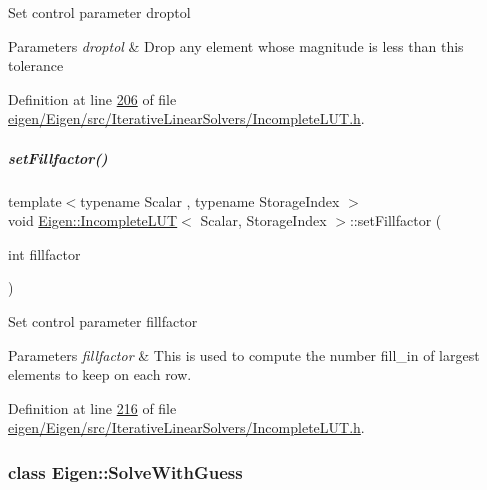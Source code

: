 Set control parameter droptol 
\begin{DoxyParams}{Parameters}
{\em droptol} & Drop any element whose magnitude is less than this tolerance \\
\hline
\end{DoxyParams}


Definition at line \hyperlink{eigen_2_eigen_2src_2_iterative_linear_solvers_2_incomplete_l_u_t_8h_source_l00206}{206} of file \hyperlink{eigen_2_eigen_2src_2_iterative_linear_solvers_2_incomplete_l_u_t_8h_source}{eigen/\+Eigen/src/\+Iterative\+Linear\+Solvers/\+Incomplete\+L\+U\+T.\+h}.

\mbox{\label{group___iterative_linear_solvers___module_a327767d12b55ff8a023f12a030051e17}} 
\subparagraph{\texorpdfstring{set\+Fillfactor()}{setFillfactor()}}
{\footnotesize\ttfamily template$<$typename Scalar , typename Storage\+Index $>$ \\
void \hyperlink{group___iterative_linear_solvers___module_class_eigen_1_1_incomplete_l_u_t}{Eigen\+::\+Incomplete\+L\+UT}$<$ Scalar, Storage\+Index $>$\+::set\+Fillfactor (\begin{DoxyParamCaption}\item[{int}]{fillfactor }\end{DoxyParamCaption})}

Set control parameter fillfactor 
\begin{DoxyParams}{Parameters}
{\em fillfactor} & This is used to compute the number {\ttfamily fill\+\_\+in} of largest elements to keep on each row. \\
\hline
\end{DoxyParams}


Definition at line \hyperlink{eigen_2_eigen_2src_2_iterative_linear_solvers_2_incomplete_l_u_t_8h_source_l00216}{216} of file \hyperlink{eigen_2_eigen_2src_2_iterative_linear_solvers_2_incomplete_l_u_t_8h_source}{eigen/\+Eigen/src/\+Iterative\+Linear\+Solvers/\+Incomplete\+L\+U\+T.\+h}.

\label{class_eigen_1_1_solve_with_guess}
\subsubsection{class Eigen\+:\+:Solve\+With\+Guess}
